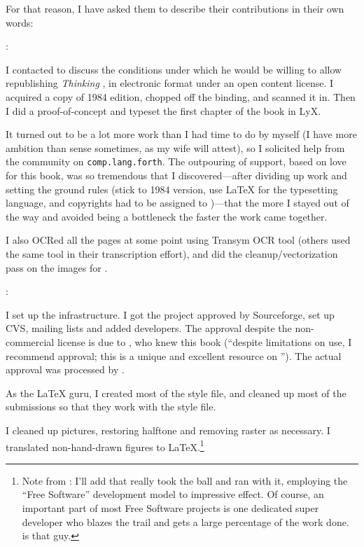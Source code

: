 For that reason, I have asked them to describe their contributions in
their own words:

\begin{interview}
:

\begin{tfquot}
I contacted  to discuss the conditions under which
he would be willing to allow republishing \emph{Thinking \Forth}, in
electronic format under an open content license. I acquired a copy of
1984 edition, chopped off the binding, and scanned it in. Then I did a
proof-of-concept and typeset the first chapter of the book in LyX.

It turned out to be a lot more work than I had time to do by myself (I
have more ambition than sense sometimes, as my wife will attest), so I
solicited help from the \Forth{} community on {\tt comp.lang.forth}. The
outpouring of support, based on love for this book, was so tremendous
that I discovered---after dividing up work and setting the ground
rules (stick to 1984 version, use \LaTeX{} for the typesetting
language, and copyrights had to be assigned to )---that the more I stayed out of the way and avoided being a
bottleneck the faster the work came together.

I also OCRed all the pages at some point using Transym OCR tool
(others used the same tool in their transcription effort), and did the
cleanup/vectorization pass on the images for .
\end{tfquot}
\end{interview}
\begin{interview*}
:
\begin{tfquot}
I set up the infrastructure. I got the project approved by
Sourceforge, set up CVS, mailing lists and added developers. The
approval despite the non-commercial license is due to , who knew this book (``despite limitations on use, I recommend
approval; this is a unique and excellent resource on \Forth{}''). The
actual approval was processed by .

As the \LaTeX{} guru, I created most of the style file, and cleaned up
most of the submissions so that they work with the style file.

I cleaned up pictures, restoring halftone and removing raster
as necessary. I translated non-hand-drawn figures to
\LaTeX{}.\footnote{Note from : I'll add that
 really took the ball and ran with it, employing the
``Free Software'' development model to impressive effect.  Of course, an
important part of most Free Software projects is one dedicated super
developer who blazes the trail and gets a large percentage of the work
done.   is that guy.}
\end{tfquot}
\end{interview*}
